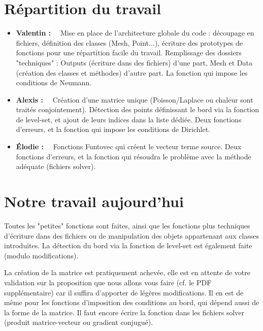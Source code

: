\documentclass[12pt]{article}
\begin{document}
\vspace{5 mm}

\section{Répartition du travail}

\noindent
\begin{itemize}
	\item\textbf{Valentin :}~~ Mise en place de l'architecture globale du code : découpage en fichiers, définition des classes (Mesh, Point...), écriture des prototypes de fonctions pour une répartition facile du travail. Remplissage des dossiers "techniques" : Outputs (écriture dans des fichiers) d'une part, Mesh et Data (création des classes et méthodes) d'autre part. La fonction qui impose les conditions de Neumann.

\vspace{5 mm}

	\item \textbf{Alexis :}~~ Création d'une matrice unique (Poisson/Laplace ou chaleur sont traités conjointement). Détection des points définissant le bord via la fonction de level-set, et ajout de leurs indices dans la liste dédiée. Deux fonctions d'erreurs, et la fonction qui impose les conditions de Dirichlet.

\vspace{5 mm}

	\item \textbf{Élodie :}~~ Fonctions Funtovec qui créent le vecteur terme source. Deux fonctions d'erreurs, et la fonction qui résoudra le problème avec la méthode adéquate (fichiers solver).
\end{itemize}

\vspace{5 mm}

\section{Notre travail aujourd'hui}

\noindent
Toutes les "petites" fonctions sont faites, ainsi que les fonctions plus techniques d'écriture dans des fichiers ou de manipulation des objets appartenant aux classes introduites. La détection du bord via la fonction de level-set est également faite (modulo modifications).

\vspace{5 mm}

\noindent
La création de la matrice est pratiquement achevée, elle est en attente de votre validation sur la proposition que nous allons vous faire (cf. le PDF supplémentaire) car il suffira d'apporter de légères modifications. Il en est de même pour les fonctions d'imposition des conditions au bord, qui dépend aussi de la forme de la matrice. Il faut encore écrire la fonction dans les fichiers solver (produit matrice-vecteur ou gradient conjugué).
\end{document}

